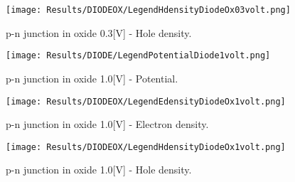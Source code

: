 \vspace{0.5cm}

\begin{figure}[!h]
\centering
{}
\hspace{0.1\textwidth}
\hspace{0.04\textwidth}
{\texttt{[image: Results/DIODEOX/LegendHdensityDiodeOx03volt.png]}}
\caption{p-n junction in oxide 0.3[V] - Hole density.}
\label{fig: hdensity diodeox}
\end{figure}

\clearpage


\begin{figure}[!h]
\centering
{}
\hspace{0.1\textwidth}
\hspace{0.04\textwidth}
{\texttt{[image: Results/DIODE/LegendPotentialDiode1volt.png]}}
\caption{p-n junction in oxide 1.0[V] - Potential.}
\label{fig: potential diodeox 1V}
\end{figure}

\vspace{0.5cm}

\begin{figure}[!h]
\centering
{}
\hspace{0.1\textwidth}
\hspace{0.04\textwidth}
{\texttt{[image: Results/DIODEOX/LegendEdensityDiodeOx1volt.png]}}
\caption{p-n junction in oxide 1.0[V] - Electron density.}
\label{fig: edensity diodeox 1V}
\end{figure}

\vspace{0.5cm}

\begin{figure}[!h]
\centering
{}
\hspace{0.1\textwidth}
\hspace{0.04\textwidth}
{\texttt{[image: Results/DIODEOX/LegendHdensityDiodeOx1volt.png]}}
\caption{p-n junction in oxide 1.0[V] - Hole density.}
\label{fig: hdensity diodeox 1V}
\end{figure}


